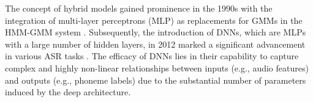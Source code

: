 
The concept of hybrid models gained prominence in the 1990s with the integration of multi-layer perceptrons (MLP) as replacements for GMMs in the HMM-GMM system \cite{bourlard2012connectionist,meinedo2003audimus}. Subsequently, the introduction of DNNs, which are MLPs with a large number of hidden layers, in 2012 marked a significant advancement in various ASR tasks \cite{hmm-dnn}. The efficacy of DNNs lies in their capability to capture complex and highly non-linear relationships between inputs (e.g., audio features) and outputs (e.g., phoneme labels) due to the substantial number of parameters induced by the deep architecture.


